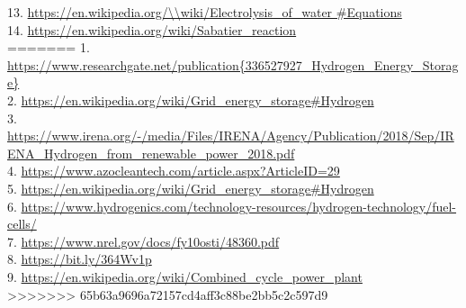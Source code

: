 \begin{parcolumns}[colwidths={1=2.5 cm, 2=12 cm}]{2}
{13. \url{https://en.wikipedia.org/\\wiki/Electrolysis\_of\_water 
\#Equations}\\
14. \url{https://en.wikipedia.org/wiki/Sabatier\_reaction}\\
=======
1. \url{https://www.researchgate.net/publication{336527927_Hydrogen_Energy_Storage}} \\
2. \url{https://en.wikipedia.org/wiki/Grid_energy_storage#Hydrogen} \\
3. \url{https://www.irena.org/-/media/Files/IRENA/Agency/Publication/2018/Sep/IRENA_Hydrogen_from_renewable_power_2018.pdf} \\
4. \url{https://www.azocleantech.com/article.aspx?ArticleID=29} \\
5. \url{https://en.wikipedia.org/wiki/Grid_energy_storage#Hydrogen} \\
6. \url{https://www.hydrogenics.com/technology-resources/hydrogen-technology/fuel-cells/} \\
7. \url{https://www.nrel.gov/docs/fy10osti/48360.pdf} \\
8. \url{https://bit.ly/364Wv1p} \\
9. \url{https://en.wikipedia.org/wiki/Combined_cycle_power_plant} \\
>>>>>>> 65b63a9696a72157cd4aff3c88be2bb5c2c597d9
}

\end{parcolumns}
\clearpage